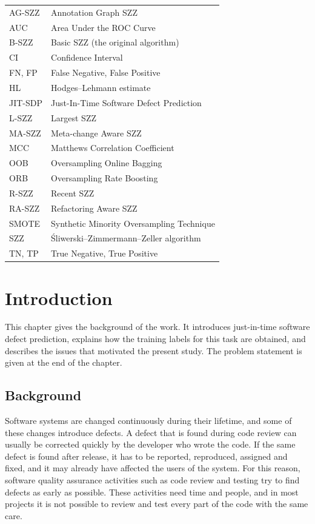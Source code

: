 \documentclass[12pt,a4paper,oneside]{report}
\begin{document}
\begin{tabular}{@{}ll@{}}
AG-SZZ & Annotation Graph SZZ \\
AUC & Area Under the ROC Curve \\
B-SZZ & Basic SZZ (the original algorithm) \\
CI & Confidence Interval \\
FN, FP & False Negative, False Positive \\
HL & Hodges--Lehmann estimate \\
JIT-SDP & Just-In-Time Software Defect Prediction \\
L-SZZ & Largest SZZ \\
MA-SZZ & Meta-change Aware SZZ \\
MCC & Matthews Correlation Coefficient \\
OOB & Oversampling Online Bagging \\
ORB & Oversampling Rate Boosting \\
R-SZZ & Recent SZZ \\
RA-SZZ & Refactoring Aware SZZ \\
SMOTE & Synthetic Minority Oversampling Technique \\
SZZ & \'{S}liwerski--Zimmermann--Zeller algorithm \\
TN, TP & True Negative, True Positive \\
\end{tabular}

\clearpage
{}
\setcounter{page}{1}

\chapter{Introduction}\label{ch:intro}

This chapter gives the background of the work. It introduces just-in-time
software defect prediction, explains how the training labels for this task are
obtained, and describes the issues that motivated the present study. The
problem statement is given at the end of the chapter.

\section{Background}

Software systems are changed continuously during their lifetime, and some of
these changes introduce defects. A defect that is found during code review can
usually be corrected quickly by the developer who wrote the code. If the same
defect is found after release, it has to be reported, reproduced, assigned and
fixed, and it may already have affected the users of the system. For this
reason, software quality assurance activities such as code review and testing
try to find defects as early as possible. These activities need time and
people, and in most projects it is not possible to review and test every part
of the code with the same care.
\end{document}
